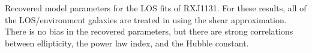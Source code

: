 \label{fig:los_triangle} Recovered model parameters for the LOS fits of RXJ1131. For these results, all of the LOS/environment galaxies are treated in using the shear approximation. There is no bias in the recovered parameters, but there are strong correlations between ellipticity, the power law index, and the Hubble constant.